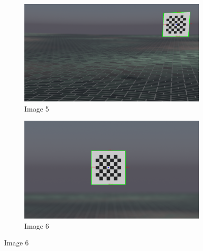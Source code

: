 \begin{figure}[h!]
    \begin{subfigure}[b]{0.45\textwidth}
        \centering
        \includegraphics[width=\textwidth]{Images/02stateart/edge_detection_5.png}
        \caption{Image 5}
    \end{subfigure}
    \hfill
    \begin{subfigure}[b]{0.45\textwidth}
        \centering
        \includegraphics[width=\textwidth]{Images/02stateart/edge_detection_6.png}
        \caption{Image 6}
    \end{subfigure}
    
    \vspace{1cm}
    

\end{figure}
